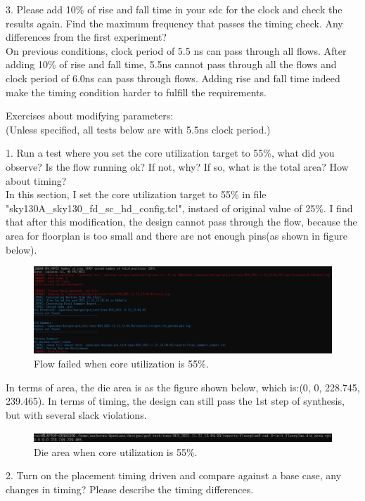 \documentclass[a4paper]{article}
\begin{document}
3. Please add 10\% of rise and fall time in your sdc for the clock and check the results again. Find the maximum frequency that passes the timing check. Any differences from the first experiment?\\

On previous conditions, clock period of 5.5 ns can pass through all flows. After adding 10\% of rise and fall time, 5.5ns cannot pass through all the flows and clock period of 6.0ns can pass through flows. Adding rise and fall time indeed make the timing condition harder to fulfill the requirements. 

Exercises about modifying parameters: \\
(Unless specified, all tests below are with 5.5ns clock period.)

1. Run a test where you set the core utilization target to 55\%, what did you observe? Is the flow running ok? If not, why? If so, what is the total area? How about timing?\\

In this section, I set the core utilization target to 55\% in file\\ "sky130A\_sky130\_fd\_sc\_hd\_config.tcl", instaed of original value of 25\%. I find that after this modification, the design cannot pass through the flow, because the area for floorplan is too small and there are not enough pins(as shown in figure below). 
\begin{figure}[H]
    \centering
    \includegraphics[width=1\textwidth]{exercise_2_1_1.png}
    \caption{Flow failed when core utilization is 55\%.}
\end{figure}
In terms of area, the die area is as the figure shown below, which is:(0, 0, 228.745, 239.465). In terms of timing, the design can still pass the 1st step of synthesis, but with several slack violations.
\begin{figure}[H]
    \centering
    \includegraphics[width=1\textwidth]{exercise_2_1_2.png}
    \caption{Die area when core utilization is 55\%.}
\end{figure}
2. Turn on the placement timing driven and compare against a base case, any changes in timing? Please describe the timing differences.\\
\end{document}
